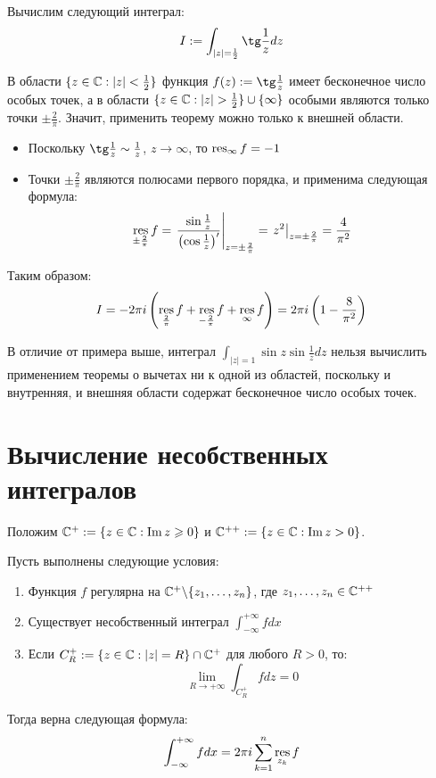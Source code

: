 \begin{example}
	Вычислим следующий интеграл:
	\[I := \int_{|z| = \frac12} \tg\frac1z dz\]
	
	В области $\{z \in \mathbb{C}: |z| < \frac12\}$ функция $f(z) := \tg\frac1z$ имеет бесконечное число особых точек, а в области $\{z \in \mathbb{C}: |z| > \frac12\} \cup \{\infty\}$ особыми являются только точки $\pm \frac2\pi$. Значит, применить теорему можно только к внешней области.
	\begin{itemize}
		\item Поскольку $\tg\frac1z \sim \frac1z$, $z \to \infty$, то $\operatorname*{res}_\infty{f} = -1$
		
		\item Точки $\pm\frac2\pi$ являются полюсами первого порядка, и применима следующая формула:
		\[\operatorname*{res}_{\pm\frac2\pi}{f} = \left.\frac{\sin\frac1z}{\left(\cos\frac1z\right)'}\right|_{z = \pm\frac2\pi} = \left.z^2\right|_{z = \pm\frac2\pi} = \frac4{\pi^2}\]
	\end{itemize}
	
	Таким образом:
	\[I = -2\pi i\left(\operatorname*{res}_{\frac2\pi}f + \operatorname*{res}_{-\frac2\pi}f + \operatorname*{res}_{\infty}f\right) = 2\pi i\left(1 - \frac8{\pi^2}\right)\]
\end{example}

\begin{note}
	В отличие от примера выше, интеграл $\int_{|z| = 1}\sin{z}\sin\frac1zdz$ нельзя вычислить применением теоремы о вычетах ни к одной из областей, поскольку и внутренняя, и внешняя области содержат бесконечное число особых точек.
\end{note}

\section{Вычисление несобственных интегралов}

Положим $\mathbb{C}^+ := \{z \in \mathbb{C}: \operatorname{Im} z \geqslant 0\}$ и $\mathbb{C}^{++} := \{z \in \mathbb{C}: \operatorname{Im} z > 0\}$.

\begin{proposition}[лемма <<$+$>>]
	Пусть выполнены следующие условия:
	\begin{enumerate}
		\item Функция $f$ регулярна на $\mathbb{C}^+ \backslash \{z_1, \dotsc, z_n\}$, где $z_1, \dotsc, z_n \in \mathbb{C}^{++}$
		\item Существует несобственный интеграл $\int_{-\infty}^{+\infty}fdx$
		\item Если $C_R^+ := \{z \in \mathbb{C}: |z| = R\} \cap \mathbb{C}^+$ для любого $R > 0$, то:
		\[\lim_{R\to +\infty} \int_{C_R^+}fdz = 0\]
	\end{enumerate}
	
	Тогда верна следующая формула:
	\[\int_{-\infty}^{+\infty}fdx = 2\pi i\sum_{k = 1}^n\operatorname*{res}_{z_k}{f}\]
\end{proposition}

